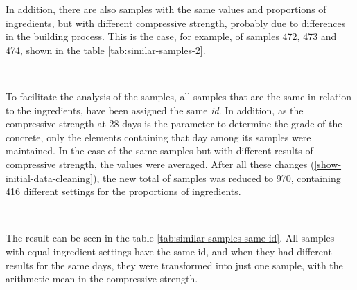 \documentclass[]{article}
\begin{document}
In addition, there are also samples with the same values and proportions
of ingredients, but with different compressive strength, probably due to
differences in the building process. This is the case, for example, of
samples 472, 473 and 474, shown in the table
\ref{tab:similar-samples-2}.

~

\begin{table}

\caption{\label{tab:similar-samples-2}Same samples with different results}
\centering
{}
\end{table}

To facilitate the analysis of the samples, all samples that are the same
in relation to the ingredients, have been assigned the same \emph{id}.
In addition, as the compressive strength at 28 days is the parameter to
determine the grade of the concrete, only the elements containing that
day among its samples were maintained. In the case of the same samples
but with different results of compressive strength, the values were
averaged. After all these changes (\ref{show-initial-data-cleaning}),
the new total of samples was reduced to 970, containing 416 different
settings for the proportions of ingredients.

~

The result can be seen in the table \ref{tab:similar-samples-same-id}.
All samples with equal ingredient settings have the same id, and when
they had different results for the same days, they were transformed into
just one sample, with the arithmetic mean in the compressive strength.
\end{document}
